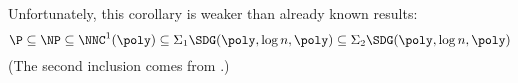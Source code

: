 \documentclass{article}
\begin{document}
Unfortunately, this corollary is weaker than already known results:
\begin{equation*}
  \P \subseteq \NP \subseteq \NNC^1(\poly) \subseteq \Sigma_1 \SDG(\poly, \log n, \poly) \subseteq \Sigma_2 \SDG(\poly, \log n, \poly)
\end{equation*}
(The second inclusion comes from \autocite[Theorem~2.2]{wolf94}.)

\printbibliography
\end{document}
